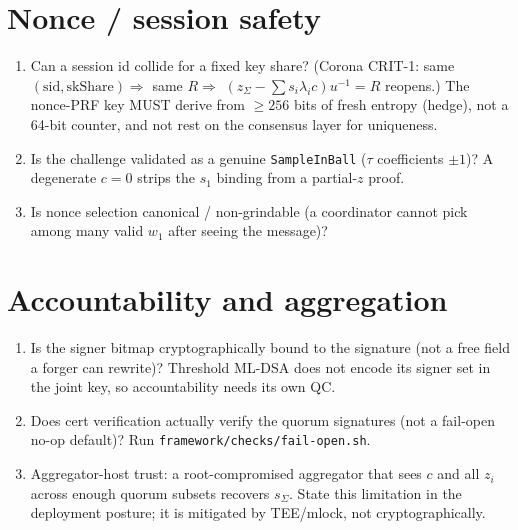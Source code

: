 \documentclass[11pt]{article}
\begin{document}
\section{Nonce / session safety}
\begin{enumerate}[leftmargin=*]
  \item Can a session id collide for a fixed key share? (Corona CRIT-1: same
    $(\mathrm{sid},\mathrm{skShare})\Rightarrow$ same $R\Rightarrow$
    $(z_\Sigma - \sum s_i\lambda_i c)u^{-1}=R$ reopens.) The nonce-PRF key MUST
    derive from $\ge256$ bits of fresh entropy (hedge), not a 64-bit counter,
    and not rest on the consensus layer for uniqueness.
  \item Is the challenge validated as a genuine \texttt{SampleInBall} ($\tau$
    coefficients $\pm1$)? A degenerate $c=0$ strips the $s_1$ binding from a
    partial-$z$ proof.
  \item Is nonce selection canonical / non-grindable (a coordinator cannot pick
    among many valid $w_1$ after seeing the message)?
\end{enumerate}

\section{Accountability and aggregation}
\begin{enumerate}[leftmargin=*]
  \item Is the signer bitmap cryptographically bound to the signature (not a
    free field a forger can rewrite)? Threshold ML-DSA does not encode its
    signer set in the joint key, so accountability needs its own QC.
  \item Does cert verification actually verify the quorum signatures (not a
    fail-open no-op default)? Run \texttt{framework/checks/fail-open.sh}.
  \item Aggregator-host trust: a root-compromised aggregator that sees $c$ and
    all $z_i$ across enough quorum subsets recovers $s_\Sigma$. State this
    limitation in the deployment posture; it is mitigated by TEE/mlock, not
    cryptographically.
\end{enumerate}
\end{document}
